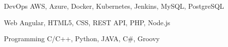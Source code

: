 

\begin{cvskills}

  \cvskill
    {DevOps} %
    {AWS, Azure, Docker, Kubernetes, Jenkins, MySQL, PostgreSQL} %

  \cvskill
    {Web} %
    {Angular, HTML5, CSS, REST API, PHP, Node.js} %

  \cvskill
    {Programming} %
    {C/C++, Python, JAVA, C\#, Groovy} %

\end{cvskills}
